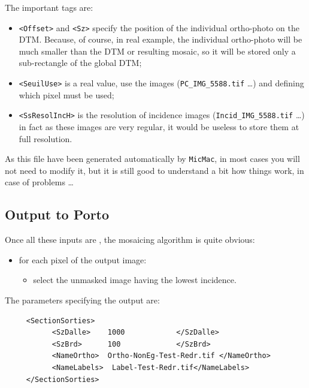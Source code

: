 The important tags are:

\begin{itemize}
   \item {\tt <Offset>} and {\tt <Sz>} specify the position of the individual ortho-photo
         on the DTM. Because, of course, in real example, the individual ortho-photo  will be much smaller
         than the DTM or resulting mosaic, so it will be stored only a sub-rectangle of the global DTM;

   \item {\tt <SeuilUse>} is a real value, use  the  images ({\tt PC\_IMG\_5588.tif} \dots) and
         defining which pixel must be used;

   \item {\tt <SsResolIncH>} is the resolution of incidence images ({\tt Incid\_IMG\_5588.tif} \dots)
         in fact as these images are very regular, it would be useless to store them at full resolution.
         
\end{itemize}


As this file have been generated automatically by {\tt MicMac}, in most cases you will
not need to modify it, but it is still good to understand a bit how things work,
in case of problems \dots



\subsection{Output to Porto}

Once  all these inputs are , %
the mosaicing
algorithm is quite obvious:

\begin{itemize}
     \item for each pixel of  the output image:
     \begin{itemize}
          \item select the unmasked image having the lowest incidence.
     \end{itemize}
\end{itemize}

The parameters specifying the output are:

{\scriptsize
\begin{verbatim}
     <SectionSorties>
           <SzDalle>    1000            </SzDalle>
           <SzBrd>      100             </SzBrd>
           <NameOrtho>  Ortho-NonEg-Test-Redr.tif </NameOrtho>
           <NameLabels>  Label-Test-Redr.tif</NameLabels>
     </SectionSorties>
\end{verbatim}
}

